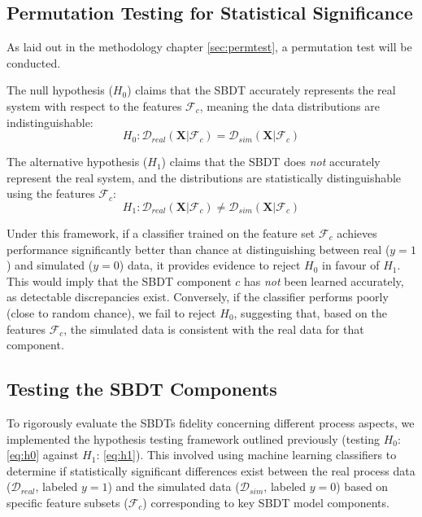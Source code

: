 \subsection*{Permutation Testing for Statistical Significance}
\label{sec:model-logic}

As laid out in the methodology chapter \autoref{sec:permtest}, a permutation test will be conducted.

\noindent The null hypothesis ($H_0$) claims that the SBDT accurately represents the real system with respect to the features $\mathcal{F}_c$, meaning the data distributions are indistinguishable:
\begin{equation}
  H_0: \mathcal{D}_{real}(\mathbf{X} | \mathcal{F}_c) = \mathcal{D}_{sim}(\mathbf{X} | \mathcal{F}_c)
  \label{eq:h0}
\end{equation}

\noindent The alternative hypothesis ($H_1$) claims that the SBDT does \textit{not} accurately represent the real system, and the distributions are statistically distinguishable using the features $\mathcal{F}_c$:
\begin{equation}
  H_1: \mathcal{D}_{real}(\mathbf{X} | \mathcal{F}_c) \neq \mathcal{D}_{sim}(\mathbf{X} | \mathcal{F}_c)
  \label{eq:h1}
\end{equation}

\noindent Under this framework, if a classifier trained on the feature set $\mathcal{F}_c$ achieves performance significantly better than chance at distinguishing between real ($y=1$) and simulated ($y=0$) data, it provides evidence to reject $H_0$ in favour of $H_1$. This would imply that the SBDT component $c$ has \emph{not} been learned accurately, as detectable discrepancies exist. Conversely, if the classifier performs poorly (close to random chance), we fail to reject $H_0$, suggesting that, based on the features $\mathcal{F}_c$, the simulated data is consistent with the real data for that component.

\subsection*{Testing the SBDT Components}
To rigorously evaluate the SBDTs fidelity concerning different process aspects, we implemented the hypothesis testing framework outlined previously (testing $H_0$: \autoref{eq:h0} against $H_1$: \autoref{eq:h1}). This involved using machine learning classifiers to determine if statistically significant differences exist between the real process data ($\mathcal{D}_{real}$, labeled $y=1$) and the simulated data ($\mathcal{D}_{sim}$, labeled $y=0$) based on specific feature subsets ($\mathcal{F}_c$) corresponding to key SBDT model components.


